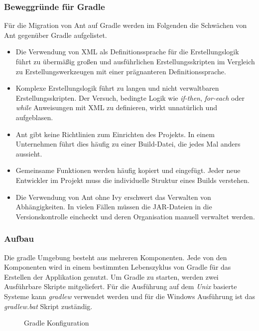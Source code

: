 \subsubsection{Beweggründe für Gradle}
Für die Migration von Ant auf Gradle werden im Folgenden die Schwächen von Ant gegenüber Gradle aufgelistet.
\begin{itemize}
  \item Die Verwendung von XML als Definitionssprache für die Erstellungslogik führt zu übermäßig großen und ausführlichen Erstellungsskripten im Vergleich zu Erstellungswerkzeugen mit einer prägnanteren Definitionssprache. \cite{muschko2014gradle}
  \item Komplexe Erstellungslogik führt zu langen und nicht verwaltbaren Erstellungsskripten. Der Versuch, bedingte Logik wie \textit{if-then}, \textit{for-each} oder \textit{while} Anweisungen mit XML zu definieren, wirkt unnatürlich und aufgeblasen.\cite{muschko2014gradle}
  \item Ant gibt keine Richtlinien zum Einrichten des Projekts. In einem Unternehmen führt dies häufig zu einer Build-Datei, die jedes Mal anders aussieht.\cite{berglund2011building}
  \item Gemeinsame Funktionen werden häufig kopiert und eingefügt. Jeder neue Entwickler im Projekt muss die individuelle Struktur eines Builds verstehen.\cite{varanasi2015introducing}
  \item Die Verwendung von Ant ohne Ivy erschwert das Verwalten von Abhängigkeiten. In vielen Fällen müssen die JAR-Dateien in die Versionskontrolle eincheckt und deren Organisation manuell verwaltet werden.\cite{varanasi2015introducing}
\end{itemize}

\subsubsection{Aufbau}
  Die gradle Umgebung besteht aus mehreren Komponenten. Jede von den Komponenten wird in einem bestimmten Lebenszyklus von Gradle für das Erstellen der Applikation genutzt.\newline
  Um Gradle zu starten, werden zwei Ausführbare Skripte mitgeliefert. Für die Ausführung auf dem \textit{Unix} basierte Systeme kann \textit{gradlew} verwendet werden und für die Windows Ausführung ist das \textit{gradlew.bat} Skript zuständig.\bigbreak
  \begin{figure}[h!]
    \centering
    \begin{minipage}{7cm}
    \end{minipage}
    \caption{Gradle Konfiguration}
    \label{fig:gradle_project_structure}
  \end{figure}


